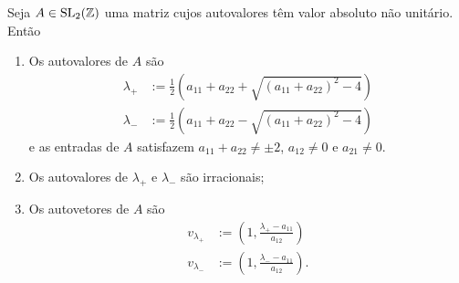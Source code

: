 \begin{proposition}
Seja $A \in \operatorname{SL}_2(\mathbb{Z})$ uma matriz cujos autovalores têm valor absoluto não unitário. Então
	\begin{enumerate}
	\item Os autovalores de $A$ são
		\begin{align*}
		\lambda_+ &:= \frac{1}{2}\left(a_{11}+a_{22} + \sqrt{(a_{11}+a_{22})^2 - 4}\right) \\
		\lambda_- &:= \frac{1}{2}\left(a_{11}+a_{22} - \sqrt{(a_{11}+a_{22})^2 - 4}\right)
		\end{align*}
e as entradas de $A$ satisfazem $a_{11}+a_{22} \neq \pm 2$, $a_{12} \neq 0$ e $a_{21} \neq 0$.
	\item Os autovalores de $\lambda_+$ e $\lambda_-$ são irracionais;
	\item Os autovetores de $A$ são
	\begin{align*}
	v_{\lambda_+} &:= \left(1, \frac{\lambda_+ -a_{11}}{a_{12}}\right) \\
	 v_{\lambda_-} &:= \left(1, \frac{\lambda_- -a_{11}}{a_{12}}\right) .
	\end{align*}
	\end{enumerate}


	\end{proposition}
